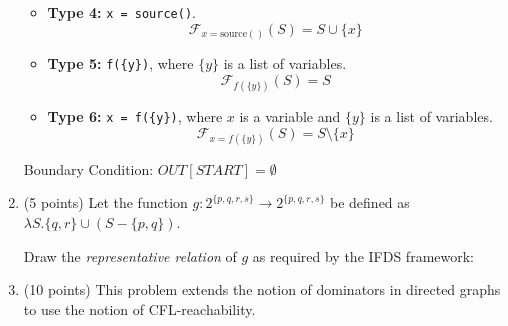 \documentclass[12pt]{article}
\begin{document}
\begin{enumerate}
\begin{mdframed}
\begin{itemize}
            \item \textbf{Type 4:} \texttt{x = source()}.
            \[
                \mathcal{F}_{x = \text{source}()}(S) = S \cup \{x\}
            \]

            \item \textbf{Type 5:} \texttt{f(\{y\})}, where $\{y\}$ is a list of variables.
            \[
                \mathcal{F}_{f(\{y\})}(S) = S
            \]

            \item \textbf{Type 6:} \texttt{x = f(\{y\})}, where $x$ is a variable and $\{y\}$ is a list of variables.
            \[
                \mathcal{F}_{x = f(\{y\})}(S) = S \setminus \{x\}
            \]


        \end{itemize}
    
        Boundary Condition: $OUT[START] = \emptyset$

      \end{mdframed}

      \item (5 points) Let the function $g: 2^{\{p,q,r, s\}} \rightarrow 2^{\{p,q,r,s\}}$ be defined 
      as $\lambda S. \{q, r\} \cup (S - \{p, q \})$. 
    
      Draw the \emph{representative relation} of $g$ as required by the IFDS framework:
    
      \begin{mdframed}
        
      \end{mdframed}

      \clearpage
      \item (10 points) This problem extends the notion of dominators in
      directed graphs to use the notion of CFL-reachability.


\end{enumerate}
\end{document}
